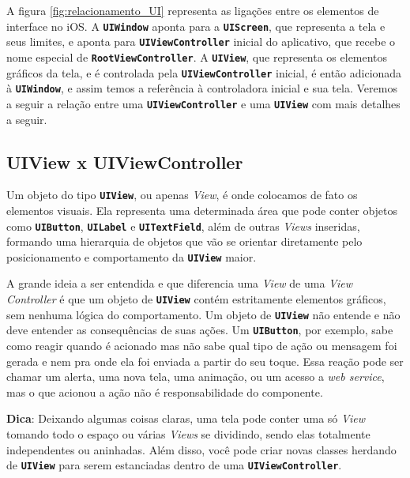 \documentclass[a4paper,12pt,brazil,doubleside]{book}
\begin{document}
\begin{singlespace}
\bigskip


A figura \ref{fig:relacionamento_UI} representa as ligações entre os elementos de interface no iOS. A \texttt{\textbf{UIWindow}} aponta para a \texttt{\textbf{UIScreen}}, que representa a tela e seus limites, e aponta para  \texttt{\textbf{UIViewController}} inicial do aplicativo, que recebe o nome especial de \texttt{\textbf{RootViewController}}. A \texttt{\textbf{UIView}}, que representa os elementos gráficos da tela, e é controlada pela \texttt{\textbf{UIViewController}} inicial, é então adicionada à \texttt{\textbf{UIWindow}}, e assim temos a referência à controladora inicial e sua tela. Veremos a seguir a relação entre uma \texttt{\textbf{UIViewController}} e uma \texttt{\textbf{UIView}} com mais detalhes a seguir.

\bigskip

\subsection{UIView x UIViewController}


Um objeto do tipo \texttt{\textbf{UIView}}, ou apenas \emph{View}, é onde colocamos de fato os elementos visuais. Ela representa uma determinada área que pode conter objetos como \texttt{\textbf{UIButton}}, \texttt{\textbf{UILabel}} e \texttt{\textbf{UITextField}}, além de outras \emph{Views} inseridas, formando uma hierarquia de objetos que vão se orientar diretamente pelo posicionamento e comportamento da \texttt{\textbf{UIView}} maior.

A grande ideia a ser entendida e que diferencia uma \emph{View} de uma \emph{View Controller} é que um objeto de \texttt{\textbf{UIView}} contém estritamente elementos gráficos, sem nenhuma lógica do comportamento. Um objeto de \texttt{\textbf{UIView}} não entende e não deve entender as consequências de suas ações. Um \texttt{\textbf{UIButton}}, por exemplo, sabe como reagir quando é acionado mas não sabe qual tipo de ação ou mensagem foi gerada e nem pra onde ela foi enviada a partir do seu toque. Essa reação pode ser chamar um alerta, uma nova tela, uma animação, ou um acesso a \emph{web service}, mas o que acionou a ação não é responsabilidade do componente.

\begin{framed}

\textbf{Dica}: Deixando algumas coisas claras, uma tela pode conter uma só \emph{View} tomando todo o espaço ou várias \emph{Views} se dividindo, sendo elas totalmente independentes ou aninhadas. Além disso, você pode criar novas classes herdando de \texttt{\textbf{UIView}} para serem estanciadas dentro de uma \texttt{\textbf{UIViewController}}.
\end{framed}



\end{singlespace}
\end{document}
